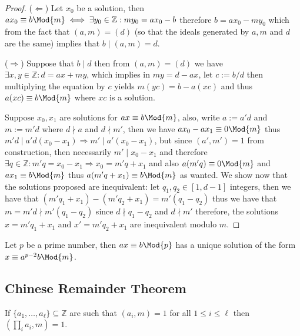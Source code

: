 \begin{proof}
   (\(\Leftarrow\)) Let \(x_0\) be a solution, then \(ax_0 \equiv b \Mod{m} \iff
   \exists y_0 \in \mathbb{Z} : my_0 = ax_0 - b\) therefore \(b = ax_0 -
   my_0\) which from the fact that \((a, m) = (d)\) (so that the ideals
   generated by \(a, m\) and  \(d\) are the same) implies that \(b \mid (a,
   m) = d\).

   (\(\Rightarrow\)) Suppose that \(b \mid d\) then from \((a, m) = (d)\) we
   have \(\exists x, y \in \mathbb{Z} : d = ax + my\), which implies in \(my = d
   - ax\), let \(c := b/d\) then multiplying the equation by \(c\) yields
   \(m(yc) = b - a(xc)\) and thus \(a(xc) \equiv b \Mod{m}\) where \(xc\) is a
   solution. 

   Suppose \(x_0, x_1\) are solutions for  \(ax \equiv b \Mod{m}\), also, write
   \(a := a'd\) and  \(m := m'd\) where \(d \nmid a\) and \(d \nmid m'\), then
   we have \(ax_0 - ax_1 \equiv 0 \Mod{m}\) thus \(m'd \mid a'd(x_0 - x_1)
   \Rightarrow m' \mid a'(x_0 - x_1)\), but since \((a', m') = 1\) from
   construction, then necessarily \(m' \mid x_0 - x_1\) and therefore \(\exists
   q \in \mathbb{Z} : m'q = x_0 - x_1 \Rightarrow x_0 = m'q + x_1\) and also
   \(a(m'q) \equiv 0 \Mod{m}\) and  \(ax_1 \equiv b \Mod{m}\) thus \(a(m'q +
   x_1) \equiv b \Mod{m}\) as wanted. We show now that the solutions proposed
   are inequivalent: let \(q_1, q_2 \in [1, d-1]\) integers, then we have that
   \((m'q_1 + x_1) - (m'q_2 + x_1) = m' (q_1 - q_2)\) thus we have that \(m =
   m'd \nmid m'(q_1 - q_2)\) since  \(d \nmid q_1 - q_2\) and \(d \nmid m'\)
   therefore, the solutions \(x = m'q_1 + x_1\) and \(x' = m'q_2 + x_1\) are
   inequivalent modulo \(m\).
\end{proof}

\begin{proposition}
   Let \(p\) be a prime number, then  \(ax \equiv b \Mod{p}\) has a unique
   solution of the form \(x \equiv a^{p-2} b \Mod{m}\).
\end{proposition}

\subsection{Chinese Remainder Theorem}

\begin{lemma}\label{ChiRemLem1}
   If \(\{a_1, \dots, a_\ell\} \subseteq \mathbb{Z}\) are such that \((a_i, m) =
   1\) for all \(1 \leqslant i \leqslant \ell\) then \((\prod_i a_i, m) = 1\). 
\end{lemma}

